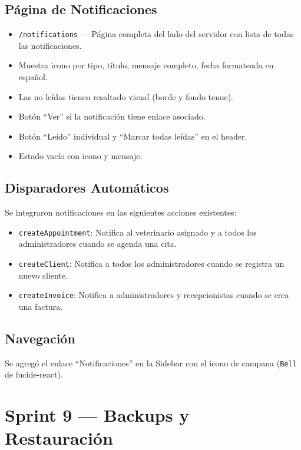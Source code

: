 \documentclass[12pt,a4paper]{article}
\begin{document}
\subsection{Página de Notificaciones}

\begin{itemize}[leftmargin=*]
    \item \texttt{/notifications} --- Página completa del lado del servidor con
          lista de todas las notificaciones.
    \item Muestra icono por tipo, título, mensaje completo, fecha formateada
          en español.
    \item Las no leídas tienen resaltado visual (borde y fondo tenue).
    \item Botón ``Ver'' si la notificación tiene enlace asociado.
    \item Botón ``Leído'' individual y ``Marcar todas leídas'' en el header.
    \item Estado vacío con icono y mensaje.
\end{itemize}

\subsection{Disparadores Automáticos}

Se integraron notificaciones en las siguientes acciones existentes:

\begin{itemize}[leftmargin=*]
    \item \texttt{createAppointment}: Notifica al veterinario asignado y a todos
          los administradores cuando se agenda una cita.
    \item \texttt{createClient}: Notifica a todos los administradores cuando se
          registra un nuevo cliente.
    \item \texttt{createInvoice}: Notifica a administradores y recepcionistas
          cuando se crea una factura.
\end{itemize}

\subsection{Navegación}

Se agregó el enlace ``Notificaciones'' en la Sidebar con el icono de campana
(\texttt{Bell} de lucide-react).

\section{Sprint 9 --- Backups y Restauración}
\end{document}
